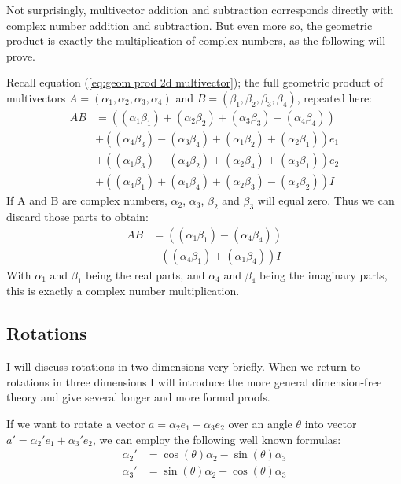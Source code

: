 \documentclass[10pt]{report}
\begin{document}
Not surprisingly, multivector addition and subtraction corresponds
directly with complex number addition and subtraction. But even
more so, the geometric product is exactly the multiplication of
complex numbers, as the following will prove.

Recall equation (\ref{eq:geom prod 2d multivector}); the full
geometric product of multivectors $A = (\alpha_1, \alpha_2,
\alpha_3, \alpha_4)$ and $B = (\beta_1, \beta_2, \beta_3,
\beta_4)$, repeated here:
\begin{align}
    AB &= ((\alpha_1 \beta_1) + (\alpha_2 \beta_2) + (\alpha_3 \beta_3) - (\alpha_4 \beta_4))     \nonumber\\
       &+ ((\alpha_4 \beta_3) - (\alpha_3 \beta_4) + (\alpha_1 \beta_2) + (\alpha_2 \beta_1)) e_1 \nonumber\\
       &+ ((\alpha_1 \beta_3) - (\alpha_4 \beta_2) + (\alpha_2 \beta_4) + (\alpha_3 \beta_1)) e_2 \nonumber\\
       &+ ((\alpha_4 \beta_1) + (\alpha_1 \beta_4) + (\alpha_2 \beta_3) - (\alpha_3 \beta_2)) I   \nonumber
\end{align}
If A and B are complex numbers, $\alpha_2$, $\alpha_3$, $\beta_2$
and $\beta_3$ will equal zero. Thus we can discard those parts to
obtain:
\begin{align}
    AB &= ((\alpha_1 \beta_1) - (\alpha_4 \beta_4))     \nonumber\\
       &+ ((\alpha_4 \beta_1) + (\alpha_1 \beta_4)) I   \nonumber
\end{align}
With $\alpha_1$ and $\beta_1$ being the real parts, and $\alpha_4$
and $\beta_4$ being the imaginary parts, this is exactly a complex
number multiplication.

\subsection{Rotations}

I will discuss rotations in two dimensions very briefly. When we
return to rotations in three dimensions I will introduce the more
general dimension-free theory and give several longer and more
formal proofs.

If we want to rotate a vector $a = \alpha_2e_1 + \alpha_3e_2$ over
an angle $\theta$ into vector $a' = \alpha_2'e_1 + \alpha_3'e_2$,
we can employ the following well known formulas:
\begin{align}
    \alpha_2' &= \cos(\theta)\alpha_2 - \sin(\theta)\alpha_3 \label{eq:standard 2d rotation x} \\
    \alpha_3' &= \sin(\theta)\alpha_2 + \cos(\theta)\alpha_3 \label{eq:standard 2d rotation y}
\end{align}
\end{document}

